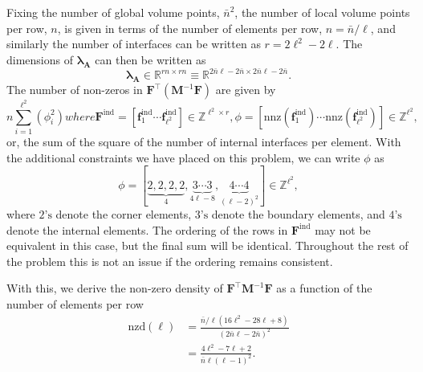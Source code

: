 Fixing the number of global volume points, $\bar{n}^2$, the number of local volume points per row, $n$, is given in terms of the number of elements per row, $n = \bar{n} / \ell$, and similarly the number of interfaces can be written as $r = 2\ell^2 - 2\ell$. The dimensions of $\symbf{\lambda}_\textbf{A}$ can then be written as 
\begin{equation}
	\symbf{\lambda}_\textbf{A} \in \mathbb{R}^{rn \times rn} \equiv \mathbb{R}^{2\bar{n}\ell - 2\bar{n} \times 2\bar{n}\ell - 2\bar{n}}. 
\end{equation}
The number of non-zeros in $\textbf{F}^{\intercal}(\textbf{M}^{-1}\textbf{F})$ are given by
\begin{subequations}
\begin{equation}
	n \sum_{i=1}^{\ell^2} (\phi_i^2)
\end{equation}
where
\begin{equation}
	\textbf{F}^{\text{ind}} = \left[\textbf{f}^{\text{ind}}_1 \cdots \textbf{f}^{\text{ind}}_{\ell^2}\right] \in \mathbb{Z}^{\ell^2 \times r},
\end{equation}
\begin{equation}
	\phi = \left[ \text{nnz}(\textbf{f}^{\text{ind}}_1) \cdots \text{nnz}(\textbf{f}^{\text{ind}}_{\ell^2}) \right] \in \mathbb{Z}^{\ell^2}, 
\end{equation}
\end{subequations}
or, the sum of the square of the number of internal interfaces per element. With the additional constraints we have placed on this problem, we can write $\phi$ as 
\begin{equation}
	\phi = \left[ \underbrace{2, 2, 2, 2}_{4}, \underbrace{3 \cdots 3}_{4\ell - 8}, \underbrace{4 \cdots 4}_{(\ell-2)^2} \right] \in \mathbb{Z}^{\ell^2}, 
\end{equation}
where $2\text{'s}$ denote the corner elements, $3\text{'s}$ denote the boundary elements, and $4\text{'s}$ denote the internal elements. The ordering of the rows in $\textbf{F}^{\text{ind}}$ may not be equivalent in this case, but the final sum will be identical. Throughout the rest of the problem this is not an issue if the ordering remains consistent. 

With this, we derive the non-zero density of $\textbf{F}^{\intercal}\textbf{M}^{-1}\textbf{F}$ as a function of the number of elements per row 
\begin{equation}
	\begin{aligned}
	\text{nzd}(\ell) &= \frac{\bar{n}/\ell (16\ell^2 - 28\ell + 8)}{(2\bar{n}\ell - 2\bar{n})^2} \\
	&= \frac{4\ell^2 - 7\ell + 2}{\bar{n}\ell(\ell-1)^2}.
	\end{aligned}
\end{equation}

